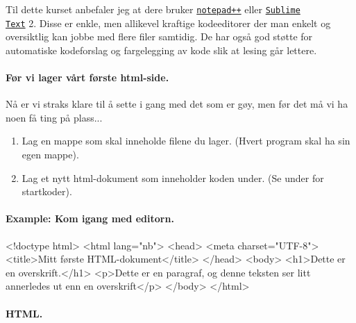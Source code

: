 \documentclass[%
oneside,                 %
final,                   %
10pt]{article}
\newenvironment{notice_mdfboxadmon}[1][]{
\begin{notice_mdfboxmdframed}[frametitle=#1]
}
{
\end{notice_mdfboxmdframed}
}
\begin{document}
Til dette kurset anbefaler jeg at dere bruker
\href{{https://notepad-plus-plus.org}}{\nolinkurl{notepad++}} eller \href{{http://www.sublimetext.com/2}}{\nolinkurl{Sublime
Text}} 2. Disse er enkle, men allikevel
kraftige kodeeditorer der man enkelt og oversiktlig kan jobbe med
flere filer samtidig. De har også god støtte for automatiske
kodeforslag og fargelegging av kode slik at lesing går lettere.

\paragraph{Før vi lager vårt første html-side.}

Nå er vi straks klare til å sette i gang med det som er gøy, men
før det må vi ha noen få ting på plass...


\begin{notice_mdfboxadmon}
\begin{enumerate}
\item Lag en mappe som skal inneholde filene du lager. (Hvert program skal ha sin egen mappe).

\item Lag et nytt html-dokument som inneholder koden under. (Se under for startkoder).
\end{enumerate}

\noindent
\end{notice_mdfboxadmon}



\paragraph{Example: Kom igang med editorn.}
\label{example:komigang}


\begin{notice_mdfboxadmon}
\bhtml
<!doctype html>
<html lang="nb">
<head>
	<meta charset="UTF-8">
	<title>Mitt første HTML-dokument</title>
</head>
<body>
	<h1>Dette er en overskrift.</h1> 
	<p>Dette er en paragraf, og denne teksten ser litt annerledes 
          ut enn en overskrift</p>
</body>
</html>

\ehtml
\end{notice_mdfboxadmon}

 


\paragraph{HTML.}
\label{section:teori:html} 
\end{document}

